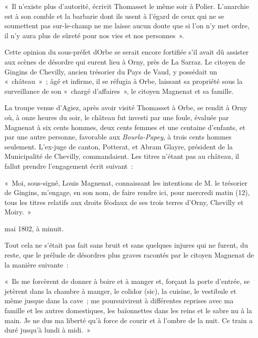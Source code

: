 \documentclass[french,twoside]{book} %
\newenvironment{quoteblock}%
  {\begin{quoting}}
  {\end{quoting}}
\newenvironment{quotebar}{%
    \def\FrameCommand{{\color{rubric!10!}\vrule width 0.5em} \hspace{0.9em}}%
    \def\OuterFrameSep{\itemsep} %
    \MakeFramed {\advance\hsize-\width \FrameRestore}
  }%
  {%
    \endMakeFramed
  }
\renewenvironment{quoteblock}%
  {%
    \savenotes
    \setstretch{0.9}
    \normalfont
    \begin{quotebar}
  }
  {%
    \end{quotebar}
    \spewnotes
  }
\begin{document}
\begin{quoteblock}
 \noindent « Il n’existe plus d’autorité, écrivit Thomasset le même soir à Polier. L’anarchie est à son comble et la barbarie dont ils usent à l’égard de ceux qui ne se soumettent pas sur-le-champ ne me laisse aucun doute que si l’on n’y met ordre, il n’y aura plus de sûreté pour nos vies et nos personnes ».
 \end{quoteblock}

\noindent Cette opinion du sous-préfet dOrbe se serait encore fortifiée s’il avait dû assister aux scènes de désordre qui eurent lieu à Orny, près de La Sarraz. Le citoyen de Gingins de Chevilly, ancien trésorier du Pays de Vaud, y possédait un « château » ; âgé et infirme, il se réfugia à Orbe, laissant sa propriété sous la surveillance de son « chargé d’affaires », le citoyen Magnenat et sa famille.\par
La troupe venue d’Agiez, après avoir visité Thomasset à Orbe, se rendit à Orny où, à onze heures du soir, le château fut investi par une foule, évaluée par Magnenat à six cents hommes, deux cents femmes et une centaine d’enfants, et par une autre personne, favorable aux \emph{Bourla-Papey}, à trois cents hommes seulement. L’ex-juge de canton, Potterat, et Abram Glayre, président de la Municipalité de Chevilly, commandaient. Les titres n’étant pas au château, il fallut prendre l’engagement écrit suivant :\par

\begin{quoteblock}
 \noindent « Moi, sous-signé, Louis Magnenat, connaissant les intentions de M. le trésorier de Gingins, m’engage, en son nom, de faire rendre ici, pour mercredi matin (12), tous les titres relatifs aux droits féodaux de ses trois terres d’Orny, Chevilly et Moiry. »
 \end{quoteblock}

 mai 1802, à minuit.\par
Tout cela ne s’était pas fait sans bruit et sans quelques injures qui ne furent, du reste, que le prélude de désordres plus graves racontés par le citoyen Magnenat de la manière suivante :\par

\begin{quoteblock}
 \noindent « Ils me forcèrent de donner à boire et à manger et, forçant la porte d’entrée, se jetèrent dans la chambre à manger, le colidor (sic), la cuisine, le vestibule et même jusque dans la cave ; me poursuivirent à différentes reprises avec ma famille et les autres domestiques, les baïonnettes dans les reins et le sabre nu à la main. Je ne dus ma liberté qu’à force de courir et à l’ombre de la nuit. Ce train a duré jusqu’à lundi à midi. »
 \end{quoteblock}
\end{document}
